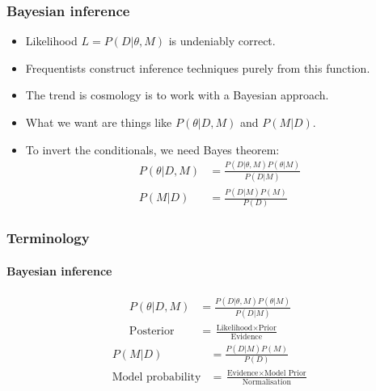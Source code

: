 \documentclass[%
]{beamer}
\begin{document}
\begin{frame}
    \frametitle{Bayesian inference}
    \begin{itemize}
        \item Likelihood $L=P(D|\theta,M)$ is undeniably correct.
        \item Frequentists construct inference techniques purely from this function.
        \item The trend is cosmology is to work with a Bayesian approach.
        \item What we want are things like $P(\theta|D,M)$ and $P(M|D)$.
        \item To invert the conditionals, we need Bayes theorem:
            \begin{align}
                P(\theta|D,M) &= \frac{P(D|\theta,M) P(\theta|M)}{P(D|M)} \nonumber\\
                P(M|D) &= \frac{P(D|M) P(M)}{P(D)} \nonumber
            \end{align}
    \end{itemize}
\end{frame}

\begin{frame}
    \frametitle{Terminology}
    \framesubtitle{Bayesian inference}
    \begin{align}
        P(\theta|D,M) &= \frac{P(D|\theta,M) P(\theta|M)}{P(D|M)} \nonumber\\
        \text{Posterior} &= \frac{\text{Likelihood}\times\text{Prior}}{\text{Evidence}} \nonumber
    \end{align}
    \begin{align}
        P(M|D) &= \frac{P(D|M) P(M)}{P(D)} \nonumber\\
        \text{Model probability} &= \frac{\text{Evidence}\times\text{Model Prior}}{\text{Normalisation}} \nonumber
    \end{align}
\end{frame}
\end{document}
